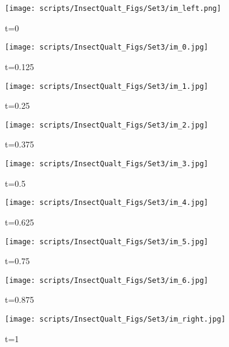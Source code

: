 \documentclass[10pt,twocolumn,letterpaper]{article}
\begin{document}
\begin{table*}[!t]
\begin{figure*}[t]
\begin{center}
    \begin{subfigure}[b]{0.1\textwidth}
        \centering
        \texttt{[image: scripts/InsectQualt\_Figs/Set3/im\_left.png]}
        \captionsetup{width=\textwidth}
        \caption{t=0}
    \end{subfigure}
    \hfill
    \begin{subfigure}[b]{0.1\textwidth}
        \centering
        \texttt{[image: scripts/InsectQualt\_Figs/Set3/im\_0.jpg]}
        \captionsetup{width=\textwidth}
        \caption{t=0.125}
    \end{subfigure}
    \hfill
    \begin{subfigure}[b]{0.1\textwidth}
        \centering
        \texttt{[image: scripts/InsectQualt\_Figs/Set3/im\_1.jpg]}
        \captionsetup{width=\textwidth}
        \caption{t=0.25}
    \end{subfigure}
    \hfill
    \begin{subfigure}[b]{0.1\textwidth}
        \centering
        \texttt{[image: scripts/InsectQualt\_Figs/Set3/im\_2.jpg]}
        \captionsetup{width=\textwidth}
        \caption{t=0.375}
    \end{subfigure}
    \hfill
    \begin{subfigure}[b]{0.1\textwidth}
        \centering
        \texttt{[image: scripts/InsectQualt\_Figs/Set3/im\_3.jpg]}
        \captionsetup{width=\textwidth}
        \caption{t=0.5}
    \end{subfigure}
    \hfill
    \begin{subfigure}[b]{0.1\textwidth}
        \centering
        \texttt{[image: scripts/InsectQualt\_Figs/Set3/im\_4.jpg]}
        \captionsetup{width=\textwidth}
        \caption{t=0.625}
    \end{subfigure}
    \hfill
    \begin{subfigure}[b]{0.1\textwidth}
        \centering
        \texttt{[image: scripts/InsectQualt\_Figs/Set3/im\_5.jpg]}
        \captionsetup{width=\textwidth}
        \caption{t=0.75}
    \end{subfigure}
    \hfill
    \begin{subfigure}[b]{0.1\textwidth}
        \centering
        \texttt{[image: scripts/InsectQualt\_Figs/Set3/im\_6.jpg]}
        \captionsetup{width=\textwidth}
        \caption{t=0.875}
    \end{subfigure}
    \hfill
    \begin{subfigure}[b]{0.1\textwidth}
        \centering
        \texttt{[image: scripts/InsectQualt\_Figs/Set3/im\_right.jpg]}
        \captionsetup{width=\textwidth}
        \caption{t=1}
    \end{subfigure}
    



\end{center}
\end{figure*}
\end{table*}
\end{document}

